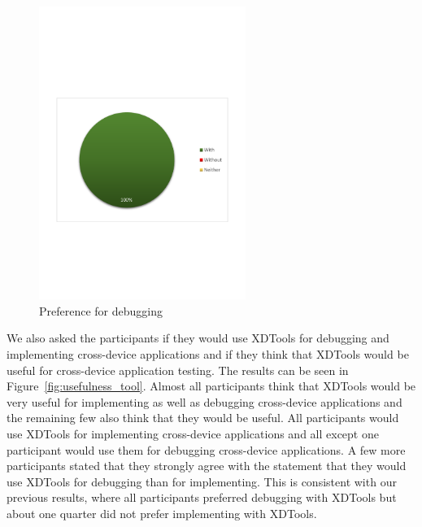 \begin{figure}[H]
  \centering
    \includegraphics[width=0.6\textwidth]{images/charts/prefer_debugging.pdf}
	\caption[Preference for debugging]{Preference for debugging}
	\label{fig:prefer_debugging}
\end{figure}


We also asked the participants if they would use XDTools for debugging and implementing cross-device applications and if they think that XDTools would be useful for cross-device application testing. The results can be seen in Figure~\ref{fig:usefulness_tool}. Almost all participants think that XDTools would be very useful for implementing as well as debugging cross-device applications and the remaining few also think that they would be useful. All participants would use XDTools for implementing cross-device applications and all except one participant would use them for debugging cross-device applications. A few more participants stated that they strongly agree with the statement that they would use XDTools for debugging than for implementing. This is consistent with our previous results, where all participants preferred debugging with XDTools but about one quarter did not prefer implementing with XDTools.

